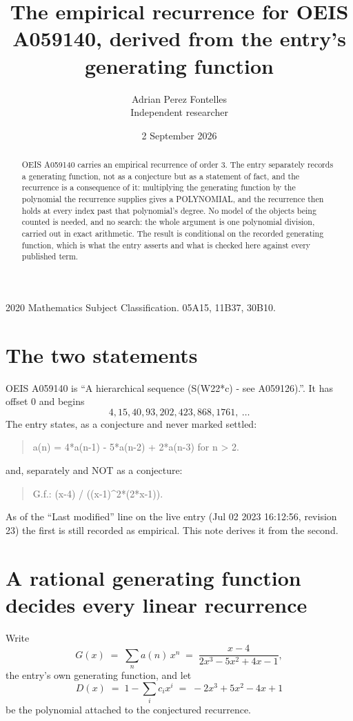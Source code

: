 \documentclass[11pt,a4paper]{article}
\title{The empirical recurrence for OEIS A059140, derived from the entry's generating function}
\author{Adrian Perez Fontelles\\ \small Independent researcher}
\date{2 September 2026}
\theoremstyle{plain}
\theoremstyle{definition}
\begin{document}
\maketitle

\begin{abstract}
OEIS A059140 carries an empirical recurrence of order $3$. The entry separately records a
generating function, not as a conjecture but as a statement of fact, and the recurrence is a
consequence of it: multiplying the generating function by the polynomial the recurrence
supplies gives a POLYNOMIAL, and the recurrence then holds at every index past that
polynomial's degree. No model of the objects being counted is needed, and no search: the
whole argument is one polynomial division, carried out in exact arithmetic. The result is
conditional on the recorded generating function, which is what the entry asserts and what is
checked here against every published term.
\end{abstract}

\noindent\small 2020 Mathematics Subject Classification. 05A15, 11B37, 30B10.\normalsize

\section{The two statements}

OEIS A059140 is ``A hierarchical sequence (S(W2{2}*c) - see A059126).''. It has offset $0$ and begins
\[
4, 15, 40, 93, 202, 423, 868, 1761,\ \dots
\]
The entry states, as a conjecture and never marked settled:
\begin{quote}
a(n) = 4*a(n-1) - 5*a(n-2) + 2*a(n-3) for n > 2.
\end{quote}
and, separately and NOT as a conjecture:
\begin{quote}
G.f.: (x-4) / ((x-1)\^{}2*(2*x-1)).
\end{quote}
As of the ``Last modified'' line on the live entry (Jul 02 2023 16:12:56, revision 23) the first is still
recorded as empirical. This note derives it from the second.

\section{A rational generating function decides every linear recurrence}

Write
\[
G(x)\;=\;\sum_{n}a(n)\,x^{n}\;=\;\frac{x - 4}{2 x^{3} - 5 x^{2} + 4 x - 1},
\]
the entry's own generating function, and let
\[
D(x)\;=\;1-\sum_i c_i x^{i}\;=\;- 2 x^{3} + 5 x^{2} - 4 x + 1
\]
be the polynomial attached to the conjectured recurrence.
\end{document}
